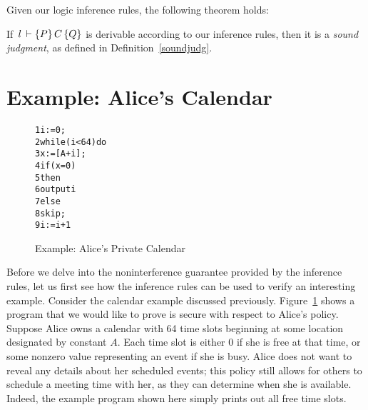 \noindent
Given our logic inference rules, the following theorem holds:

\begin{thm}[Soundness]
If $\, l \, \vdash \{P\} \, C \, \{Q\}$ is derivable according to our inference rules, then it is a \emph{sound judgment}, as defined
in Definition~\ref{soundjudg}.
\end{thm}

\section{Example: Alice's Calendar}

\begin{figure}[t]
\begin{alltt}
1  i := 0;
2  while (i < 64) do
3      x := [A+i];
4      if (x = 0)
5          then 
6              output i
7          else 
8              skip;
9      i := i+1
\end{alltt}
\caption{Example: Alice's Private Calendar}
\label{calexample}
\end{figure}

Before we delve into the noninterference guarantee provided by the inference rules, 
let us first see how the inference rules can be used to verify an interesting example.
Consider the calendar example discussed previously.
Figure~\ref{calexample} shows a program that we would like to prove is secure with
respect to Alice's policy. Suppose Alice owns a calendar with 64 time slots 
beginning at some location designated by constant $A$. Each time slot is either 0 if she is 
free at that time, or some nonzero value representing an event if she is busy. Alice does
not want to reveal any details about her scheduled events; this policy still allows for others to 
schedule a meeting time with her, as they can determine when she is available. Indeed, the 
example program shown here simply prints out all free time slots.

